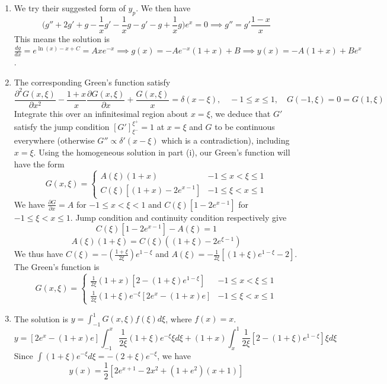 \documentclass[a4paper]{article}
\begin{document}
\begin{ans}\leavevmode
\begin{enumerate}[label=(\roman*)]
\item We try their suggested form of $y_p$. We then have
$$\bigg(g''+2g'+g-\frac{1}{x}g'-\frac{1}{x}g-g'-g+\frac{1}{x}g\bigg)e^x=0\implies g''=g'\frac{1-x}{x}$$
This means the solution is $\frac{dg}{dx}=e^{\ln(x)-x+C}=Axe^{-x}\implies g(x)=-Ae^{-x}(1+x)+B\implies y(x)=-A(1+x)+Be^x$.
\item The corresponding Green's function satisfy 
$$\frac{\partial^2G(x,\xi)}{\partial x^2}-\frac{1+x}{x}\frac{\partial G(x,\xi)}{\partial x}+\frac{G(x,\xi)}{x}=\delta(x-\xi),\quad -1\leq x\leq 1,\quad G(-1,\xi)=0=G(1,\xi)$$
Integrate this over an infinitesimal region about $x=\xi$, we deduce that $G'$ satisfy the jump condition $[G']_{\xi^-}^{\xi^+}=1$ at $x=\xi$ and $G$ to be continuous everywhere (otherwise $G''\propto\delta'(x-\xi)$ which is a contradiction), including $x=\xi$. Using the homogeneous solution in part (i), our Green's function will have the form
$$G(x,\xi)=
\left\{
        \begin{array}{ll}
      A(\xi)(1+x)& -1\leq x<\xi\leq1 \\
      C(\xi)[(1+x)-2e^{x-1}]& -1\leq\xi<x\leq 1
        \end{array}
    \right.$$
We have $\frac{\partial G}{\partial x}=A$ for $-1\leq x<\xi<1$ and $C(\xi)[1-2e^{x-1}]$ for $-1\leq\xi<x\leq1$. Jump condition and continuity condition respectively give $$C(\xi)[1-2e^{x-1}]-A(\xi)=1$$ $$A(\xi)(1+\xi)=C(\xi)((1+\xi)-2e^{\xi-1})$$
We thus have $C(\xi)=-(\frac{1+\xi}{2\xi})e^{1-\xi}$ and $A(\xi)=-\frac{1}{2\xi}[(1+\xi)e^{1-\xi}-2]$. The Green's function is
$$G(x,\xi)=
\left\{
        \begin{array}{ll}
      \frac{1}{2\xi}(1+x)[2-(1+\xi)e^{1-\xi}]& -1\leq x<\xi\leq1 \\
      \frac{1}{2\xi}(1+\xi)e^{-\xi}[2e^x-(1+x)e] & -1\leq\xi<x\leq 1
        \end{array}
    \right.$$
\item The solution is $y=\int_{-1}^1G(x,\xi)f(\xi)d\xi$, where $f(x)=x$.
$$y=[2e^x-(1+x)e]\int_{-1}^x\frac{1}{2\xi}(1+\xi)e^{-\xi}\xi d\xi+(1+x)\int_x^1\frac{1}{2\xi}[2-(1+\xi)e^{1-\xi}]\xi d\xi$$
Since $\int(1+\xi)e^{-\xi}d\xi=-(2+\xi)e^{-\xi}$, we have
$$y(x)=\frac{1}{2}[2e^{x+1}-2x^2+(1+e^2)(x+1)]$$
\end{enumerate}
\end{ans}
\newpage
\end{document}
